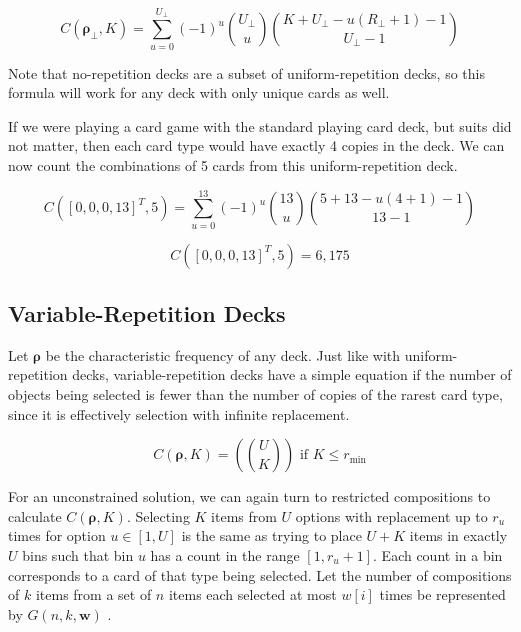 \documentclass{article}
\begin{document}
\begin{equation}
    C(\bm{\rho_\bot}, K) = \sum_{u = 0}^{U_\bot}(-1)^u \binom{U_\bot}{u}\binom{K + U_\bot - u(R_\bot + 1) - 1}{U_\bot - 1}
\end{equation}

Note that no-repetition decks are a subset of uniform-repetition decks, so this formula will work for any deck with only unique cards as well.

If we were playing a card game with the standard playing card deck, but suits did not matter, then each card type would have exactly 4 copies in the deck. We can now count the combinations of 5 cards from this uniform-repetition deck.

\begin{equation}
    C([0, 0, 0, 13]^T, 5) = \sum_{u = 0}^{13}(-1)^u \binom{13}{u}\binom{5 + 13 - u(4 + 1) - 1}{13 - 1}
\end{equation}

\begin{equation}
    C([0, 0, 0, 13]^T, 5) = 6,175
\end{equation}

\subsection{Variable-Repetition Decks}

Let $\bm{\rho}$ be the characteristic frequency of any deck. Just like with uniform-repetition decks, variable-repetition decks have a simple equation if the number of objects being selected is fewer than the number of copies of the rarest card type, since it is effectively selection with infinite replacement.

\begin{equation}
    C(\bm{\rho}, K) = \left (\binom{U}{K}\right) \text{ if } K \leq r_{\min}
\end{equation}

For an unconstrained solution, we can again turn to restricted compositions to calculate $C(\bm{\rho}, K)$. Selecting $K$ items from $U$ options with replacement up to $r_u$ times for option $u \in [1, U]$ is the same as trying to place $U + K$ items in exactly $U$ bins such that bin $u$ has a count in the range $[1, r_u + 1]$. Each count in a bin corresponds to a card of that type being selected. Let the number of compositions of $k$ items from a set of $n$ items each selected at most $w[i]$ times be represented by $G(n, k, \bm{w})$ \cite{abramson}.
\end{document}
